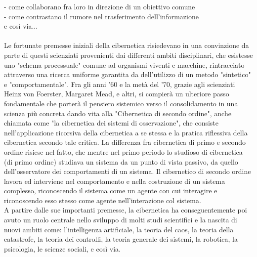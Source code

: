 - come collaborano fra loro in direzione di un obiettivo comune
\\
- come contrastano il rumore nel trasferimento dell'informazione
\\
  e così via...
\\ \\
Le fortunate premesse iniziali della cibernetica risiedevano in una convinzione
da parte di questi scienziati provenienti dai differenti ambiti disciplinari,
che esistesse uno "schema processuale" comune ad organismi viventi e macchine,
rintracciato attraverso una ricerca uniforme garantita da dell'utilizzo di un metodo
"sintetico" e "comportamentale".
Fra gli anni '60 e la metà del '70, grazie agli scienziati
Heinz von Foerster, Margaret Mead, e altri,
si compierà un ulteriore passo fondamentale che porterà
il pensiero sistemico verso il consolidamento in una scienza più concreta
dando vita alla "Cibernetica di secondo ordine",
anche chiamata come "la cibernetica dei sistemi di osservazione",
che consiste nell'applicazione
ricorsiva della cibernetica a se stessa e la pratica riflessiva della cibernetica
secondo tale critica.
La differenza fra cibernetica di primo e secondo ordine risiese nel fatto,
che mentre nel primo periodo lo studioso di cibernetica (di primo ordine)
studiava un sistema da un punto di vista passivo, da quello dell'osservatore
dei comportamenti di un sistema.
Il  cibernetico di secondo ordine lavora ed interviene nel comportamento
e nella costruzione di un sistema complesso,
riconoscendo il sistema come un agente con cui interagire e
riconoscendo esso stesso come agente nell'interazione col sistema. \\
A partire dalle sue importanti premesse,
la cibernetica ha conseguentemente poi avuto un ruolo centrale nello sviluppo di
molti studi scientifici e la nascita
di nuovi ambiti come: l'intelligenza artificiale, la teoria del caos,
la teoria della catastrofe,
la teoria dei controlli, la teoria generale dei sistemi, la robotica,
la psicologia, le scienze sociali, e così via.

